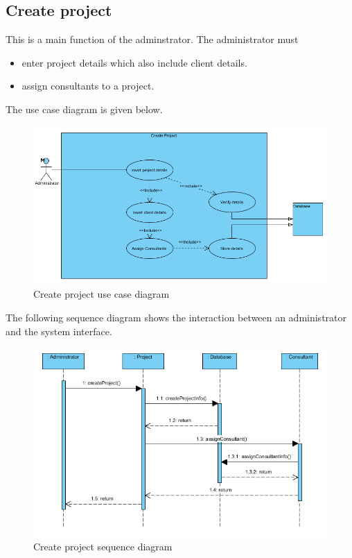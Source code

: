 \documentclass[a4paper, 12pt, oneside]{article}
\begin{document}
\subsection{Create project}
This is a main function of the adminstrator. The administrator must
\begin{itemize}
	\item enter project details which also include client details.
	\item assign consultants to a project.
\end{itemize}
The use case diagram is given below.
\\
\begin{figure}[h!]
\includegraphics[width = \linewidth]{images/createProjectUCD.png}
	\caption{Create project use case diagram}
\end{figure}
\newpage
 The following sequence diagram shows the interaction between an administrator and the system interface. 
\begin{figure}[h!]
\includegraphics[width = \linewidth]{images/createProject.png}
	\caption{Create project sequence diagram}
\end{figure}
\end{document}
